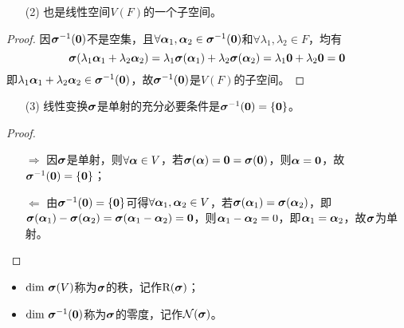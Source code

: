 \begin{frame}
  \begin{itemize}
    \item[(2)] 也是线性空间$V(F)$的一个子空间。   
  \end{itemize} \pause 

  \begin{proof}
    因$\sigmabd^{-1}(\M0)$不是空集，且$\forall \alphabd_1,\alphabd_2\in \sigmabd^{-1}(\M0)$和$\forall \lambda_1,\lambda_2\in F$，均有
    $$
    \sigmabd(\lambda_1\alphabd_1+\lambda_2\alphabd_2)=\lambda_1\sigmabd(\alphabd_1)+\lambda_2\sigmabd(\alphabd_2)=\lambda_1\M0+\lambda_2\M0=\M0
    $$
    即$\lambda_1\alphabd_1+\lambda_2\alphabd_2\in\sigmabd^{-1}(\M0)$，故$\sigmabd^{-1}(\M0)$是$V(F)$的子空间。
  \end{proof}
\end{frame}

\begin{frame}
  \begin{itemize}
    \item[(3)] 线性变换$\boldsymbol{\sigma}$是单射的充分必要条件是$\sigmabd^{-1}(\M0) = \{\M0\}$。   
  \end{itemize}\pause 

  \begin{proof}
    \begin{itemize}
    \item[$\Rightarrow$] 因$\boldsymbol{\sigma}$是单射，则$\forall \boldsymbol{\alpha} \in V$，若$\sigmabd(\alphabd)=\M0=\sigmabd(\M0)$，则$\alphabd=\M0$，故$\sigmabd^{-1}(\M0) = \{\M0\}$；\\[.1in] \pause 
    \item[$\Leftarrow$] 由$\sigmabd^{-1}(\M0) = \{\M0\}$可得$\forall \boldsymbol{\alpha}_1,\boldsymbol{\alpha}_2\in V$，若$\boldsymbol{\sigma}(\boldsymbol{\alpha}_1)=\boldsymbol{\sigma}(\boldsymbol{\alpha}_2)$，即$\sigmabd(\alphabd_1)-\sigmabd(\alphabd_2)=\sigmabd(\alphabd_1-\alphabd_2)=\M0$，则$\boldsymbol{\alpha}_1-\boldsymbol{\alpha}_2=0$，即$\boldsymbol{\alpha}_1=\boldsymbol{\alpha}_2$，故$\boldsymbol{\sigma}$为单射。
    \end{itemize}
  \end{proof}
\end{frame}


\begin{frame}
  \begin{itemize}
    \item $\mathrm{dim~} \boldsymbol{\sigma}(V)$称为$\boldsymbol{\sigma}$的秩，记作$\mathrm{R}(\boldsymbol{\sigma})$；\\[.15in]
    \item $\dim \sigmabd^{-1}(\M0)$称为$\boldsymbol{\sigma}$的零度，记作$\mathcal N(\boldsymbol{\sigma})$。
    \end{itemize}
\end{frame}

